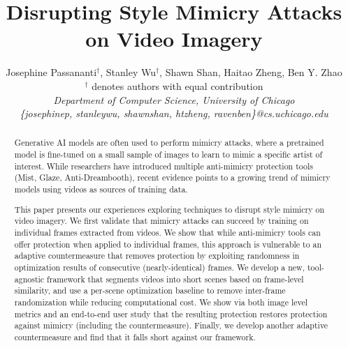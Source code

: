 \documentclass[nonacm, sigconf]{acmart}
\begin{document}
\title{Disrupting Style Mimicry Attacks on Video Imagery}
\author{Josephine Passananti$^\dag$, Stanley Wu$^\dag$, Shawn Shan, Haitao Zheng, Ben Y. Zhao\\
$^\dag$ denotes authors with equal contribution\\
  {\em Department of Computer Science, University of Chicago}\\
  {\em \{josephinep, stanleywu, shawnshan, htzheng, ravenben\}@cs.uchicago.edu}}

\begin{abstract}
  Generative AI models are often used to perform mimicry attacks, where a
  pretrained model is fine-tuned on a small sample of images to learn to
  mimic a specific artist of interest. While researchers have introduced
  multiple anti-mimicry protection tools (Mist, Glaze, Anti-Dreambooth),
  recent evidence points to a growing trend of mimicry models using videos as
  sources of training data. 

  This paper presents our experiences exploring techniques to disrupt style
  mimicry on video imagery. We first validate that mimicry attacks can
  succeed by training on individual frames extracted from videos. We show
  that while anti-mimicry tools can offer protection when applied to individual
  frames, this approach is vulnerable to an adaptive countermeasure that removes protection
  by exploiting randomness in optimization results of consecutive
  (nearly-identical) frames. We develop a new, tool-agnostic
  framework that segments videos into short scenes based on frame-level
  similarity, and use a per-scene optimization baseline to remove inter-frame
  randomization while reducing computational cost. We show via both image
  level metrics and an end-to-end user study that the resulting
  protection restores protection against mimicry (including the
  countermeasure). Finally, we develop another adaptive countermeasure and
  find that it falls short against our framework.
\end{abstract}

\maketitle
\pagestyle{plain}













\balance

\appendix

\end{document}
